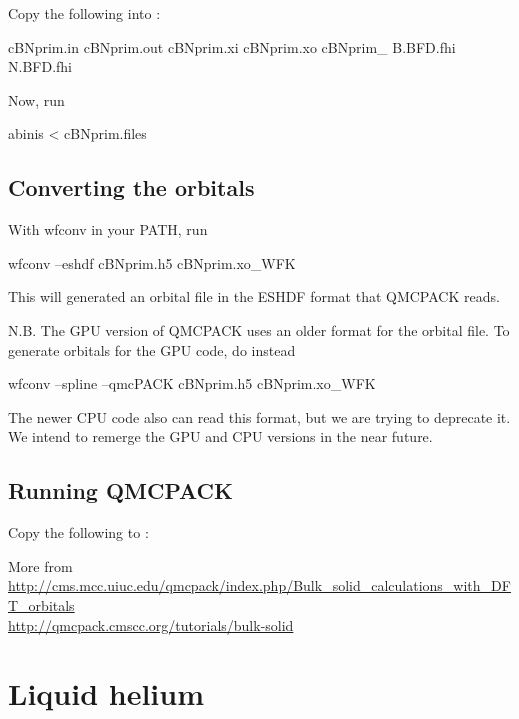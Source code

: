 Copy the following into :
\begin{code}
cBNprim.in
cBNprim.out
cBNprim.xi
cBNprim.xo
cBNprim_
B.BFD.fhi
N.BFD.fhi
\end{code}

Now, run
\begin{console}
abinis < cBNprim.files
\end{console}

\subsection*{Converting the orbitals}
With wfconv in your PATH, run
\begin{console}
wfconv --eshdf cBNprim.h5 cBNprim.xo_WFK
\end{console}

This will generated an orbital file in the ESHDF format that QMCPACK reads.

N.B. The GPU version of QMCPACK uses an older format for the orbital file. To generate orbitals for the GPU code, do instead
\begin{console}
wfconv --spline --qmcPACK cBNprim.h5 cBNprim.xo_WFK
\end{console}

The newer CPU code also can read this format, but we are trying to deprecate it. We intend to remerge the GPU and CPU versions in the near future. 

\subsection*{Running QMCPACK}
Copy the following to :

More from\\
\url{http://cms.mcc.uiuc.edu/qmcpack/index.php/Bulk_solid_calculations_with_DFT_orbitals}\\
\url{http://qmcpack.cmscc.org/tutorials/bulk-solid}
\section{Liquid helium}
